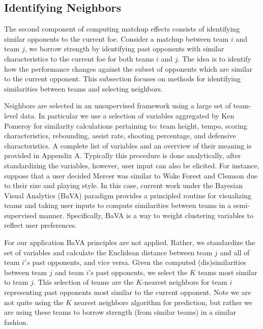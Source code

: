 \documentclass[letterpaper,12pt]{article}
\begin{document}
\subsection{Identifying Neighbors}
The second component of computing matchup effects consists of identifying similar opponents to the current foe. Consider a matchup between team $i$ and team $j$, we borrow strength by identifying past opponents with similar characteristics to the current foe for both teams $i$ and $j$. The idea is to identify how the performance changes against the subset of opponents which are similar to the current opponent. This subsection focuses on methods for identifying similarities between teams and selecting neighbors.

Neighbors are selected in an unsupervised framework using a large set of team-level data. In particular we use a selection of variables aggregated by Ken Pomeroy \citep{kenpom.com} for similarity calculations pertaining to: team height, tempo, scoring characteristics, rebounding,  assist rate, shooting percentage, and defensive characteristics. A complete list of variables and an overview of their meaning is provided in Appendix A. Typically this procedure is done analytically, after standardizing the variables, however, user input can also be elicited. For instance, suppose that a user decided Mercer was similar to Wake Forest and Clemson due to their size and playing style. In this case, current work under the Bayesian Visual Analytics (BaVA) paradigm \citep{house2010, hu2013} provides a principled routine for visualizing teams and taking user inputs to compute similarities between teams in a semi-supervised manner. Specifically, BaVA is a way to weight clustering variables to reflect user preferences.

For our application BaVA principles are not applied. Rather, we standardize the set of variables and calculate the Euclidean distance between team $j$ and all of team $i's$ past opponents, and vice versa. Given the computed (dis)similarities between team $j$ and team $i$'s past opponents, we select the $K$ teams most similar to team $j$. This selection of teams are the $K$-nearest neighbors for team $i$ representing past opponents most similar to the current opponent. Note we are not quite using the $K$ nearest neighbors algorithm for prediction, but rather we are using these teams to borrow strength (from similar teams) in a similar fashion.
\end{document}
